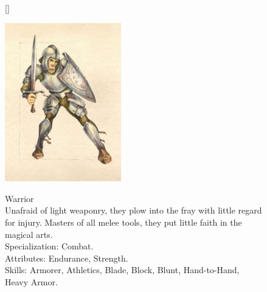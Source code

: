 \documentclass[12pt]{book}
\begin{document}
\begin{figure}[H]
[\FBwidth]
{\caption*{Warrior\\

Unafraid of light weaponry, they plow into the fray with little regard for injury. Masters of all melee tools, they put little faith in the magical arts.\\

Specialization: Combat.\\

Attributes: Endurance, Strength.\\

Skills: Armorer, Athletics, Blade, Block, Blunt, Hand-to-Hand, Heavy Armor.}\label{fig:test}}
{\includegraphics[width=0.45\textwidth]{Warriorclass.png}}
\end{figure}
\end{document}
